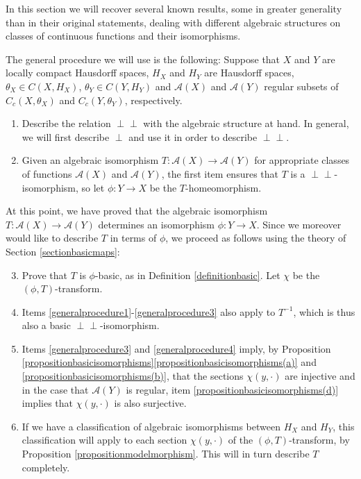 \documentclass[letter,11pt]{amsart}
\theoremstyle{plain}		\newtheorem{theorem}[generalnumbering]{Theorem}
\theoremstyle{plain}		\newtheorem{corollary}[generalnumbering]{Corollary}
\theoremstyle{definition}		\newtheorem{definition}[generalnumbering]{Definition}
\theoremstyle{definition}		\newtheorem{example}[generalnumbering]{Example}
\theoremstyle{plain}		\newtheorem{proposition}[generalnumbering]{Proposition}
\theoremstyle{plain}		\newtheorem{lemma}[generalnumbering]{Lemma}
\theoremstyle{definition}
\newcommand{\perpp}{\perp\!\!\!\perp}
\begin{document}
In this section we will recover several known results, some in greater generality than in their original statements, dealing with different algebraic structures on classes of continuous functions and their isomorphisms.

The general procedure we will use is the following: Suppose that $X$ and $Y$ are locally compact Hausdorff spaces, $H_X$ and $H_Y$ are Hausdorff spaces, $\theta_X\in C(X,H_X)$, $\theta_Y\in C(Y,H_Y)$ and $\mathcal{A}(X)$ and $\mathcal{A}(Y)$ regular subsets of $C_c(X,\theta_X)$ and $C_c(Y,\theta_Y)$, respectively.
\begin{enumerate}[label=\arabic*.]\label{generalprocedureforclassification}
	\item\label{generalprocedure1} Describe the relation $\perpp$ with the algebraic structure at hand. In general, we will first describe $\perp$ and use it in order to describe $\perpp$.
	\item\label{generalprocedure2} Given an algebraic isomorphism $T\colon\mathcal{A}(X)\to\mathcal{A}(Y)$ for appropriate classes of functions $\mathcal{A}(X)$ and $\mathcal{A}(Y)$, the first item ensures that $T$ is a $\perpp$-isomorphism, so let $\phi\colon Y\to X$ be the $T$-homeomorphism.
\end{enumerate}
At this point, we have proved that the algebraic isomorphism $T\colon\mathcal{A}(X)\to\mathcal{A}(Y)$ determines an isomorphism $\phi\colon Y\to X$. Since we moreover would like to describe $T$ in terms of $\phi$, we proceed as follows using the theory of Section \ref{sectionbasicmaps}:
\begin{enumerate}[label=\arabic*.]\setcounter{enumi}{2}
	\item\label{generalprocedure3} Prove that $T$ is $\phi$-basic, as in Definition \ref{definitionbasic}. Let $\chi$ be the $(\phi,T)$-transform.
	\item\label{generalprocedure4} Items \ref{generalprocedure1}-\ref{generalprocedure3} also apply to $T^{-1}$, which is thus also a basic $\perpp$-isomorphism.
	\item\label{generalprocedure5} Items \ref{generalprocedure3} and \ref{generalprocedure4}  imply, by Proposition \ref{propositionbasicisomorphisms}\ref{propositionbasicisomorphisms(a)} and \ref{propositionbasicisomorphisms(b)}, that the sections $\chi(y,\cdot)$ are injective and in the case that $\mathcal{A}(Y)$ is regular, item \ref{propositionbasicisomorphisms(d)} implies that $\chi(y,\cdot)$ is also surjective.
	\item\label{generalprocedure6} If we have a classification of algebraic isomorphisms between $H_X$ and $H_Y$, this classification will apply to each section $\chi(y,\cdot)$ of the $(\phi,T)$-transform, by Proposition \ref{propositionmodelmorphism}. This will in turn describe $T$ completely.
\end{enumerate}
\end{document}

